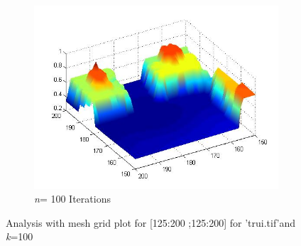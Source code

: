 \documentclass[a4paper, 10pt, conference] {article}
\begin{document}
\begin{figure}[H]
	\begin{subfigure}{0.29\textwidth} 						\includegraphics[scale=0.300]{mesh_solution3.JPG}
		\caption{\textit{n}= 100 Iterations}
	\end{subfigure}
	\caption{Analysis with mesh grid plot for [125:200 ;125:200] for 'trui.tif'and \textit{k}=100}
	\label{mesh}
\end{figure}
	
\end{document}
